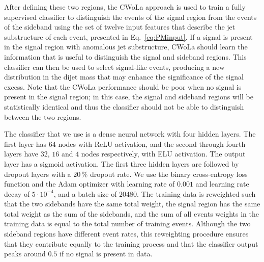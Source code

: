 \documentclass[a4paper,11pt]{article}
\begin{document}
After defining these two regions, the CWoLa approach is used to train a fully supervised classifier to distinguish the events of the signal region from the events of the sideband using the set of twelve input features that describe the jet substructure of each event, presented in Eq.~\eqref{eq:PMinput}. If a signal is present in the signal region with anomalous jet substructure, CWoLa should learn the information that is useful to distinguish the signal and sideband regions. This classifier can then be used to select signal-like events, producing a new distribution in the dijet mass that may enhance the significance of the signal excess. Note that the CWoLa performance should be poor when no signal is present in the signal region; in this case, the signal and sideband regions will be statistically identical and thus the classifier should not be able to distinguish between the two regions.

The classifier that we use is a dense neural network with four hidden layers. The first layer has $64$ nodes with ReLU activation, and the second through fourth layers have $32$, $16$ and $4$ nodes respectively, with ELU activation. The output layer has a sigmoid activation. The first three hidden layers are followed by dropout layers with a $20 \, \%$ dropout rate. We use the binary cross-entropy loss function and the Adam optimizer with learning rate of $0.001$ and learning rate decay of $5 \cdot 10^{-4}$, and a batch size of $20480$. The training data is reweighted such that the two sidebands have the same total weight, the signal region has the same total weight as the sum of the sidebands, and the sum of all events weights in the training data is equal to the total number of training events. Although the two sideband regions have different event rates, this reweighting procedure ensures that they contribute equally to the training process and that the classifier output peaks around $0.5$ if no signal is present in data.
\end{document}
